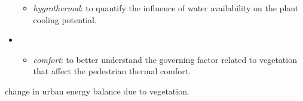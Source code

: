 \begin{itemize}
\begin{itemize}
			\item \textit{hygrothermal}: to quantify the influence of water availability on the plant cooling potential.
		\end{itemize}
	\item {}
		\begin{itemize}
			\item \textit{comfort}: to better understand the governing factor related to vegetation that affect the pedestrian thermal comfort. 				
		\end{itemize}
\end{itemize}



change in urban energy balance due to vegetation.

